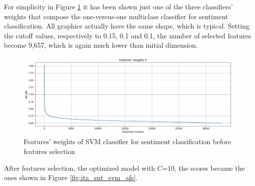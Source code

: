 For simplicity in Figure \ref{fig:ita_snt_svm_fs} it has been shown just one of the three classifiers' weights that compose the one-versus-one multiclass classifier for sentiment classification. All graphics actually have the same shape, which is typical. Setting the cutoff values, respectively to 0.15, 0.1 and 0.1, the number of selected features become 9,657, which is again much lower than initial dimension.

\begin{figure}[H]
	\centering
	\includegraphics[width=\textwidth]{figures/conf_matrices/ita_snt_svm/ita_snt_svm_fs.png}
	\caption{Features' weights of SVM classifier for sentiment classification before features selection}
	\label{fig:ita_snt_svm_fs}
\end{figure}

After features selection, the optimized model with $C$=10, the scores became the ones shown in Figure \ref{fig:ita_snt_svm_afs}.

